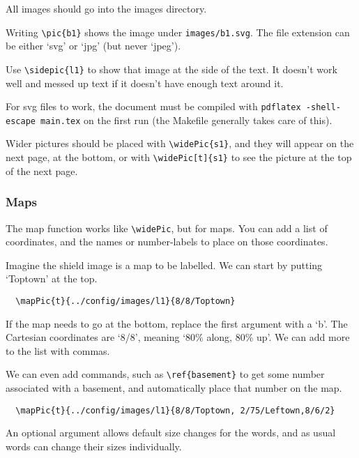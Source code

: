\documentclass[a4paper,openany]{book}
\begin{document}
\begin{multicols}{2}
All images should go into the images directory.

Writing \verb"\pic{b1}" shows the image under \verb"images/b1.svg".
The file extension can be either `svg' or `jpg' (but never `jpeg').

Use \verb"\sidepic{l1}" to show that image at the side of the text.
It doesn't work well and messed up text if it doesn't have enough text around it.


For svg files to work, the document must be compiled with \verb"pdflatex -shell-escape main.tex" on the first run (the Makefile generally takes care of this).

Wider pictures should be placed with \verb"\widePic{s1}", and they will appear on the next page, at the bottom, or with \verb"\widePic[t]{s1}" to see the picture at the top of the next page.


\subsubsection{Maps}

The map function works like \verb"\widePic", but for maps.
You can add a list of coordinates, and the names or number-labels to place on those coordinates.


Imagine the shield image is a map to be labelled.
We can start by putting `Toptown' at the top.

\begin{verbatim}
  \mapPic{t}{../config/images/l1}{8/8/Toptown}
\end{verbatim}

If the map needs to go at the bottom, replace the first argument with a `b'.
The Cartesian coordinates are `8/8', meaning `80\% along, 80\% up'.
We can add more to the list with commas.

We can even add commands, such as \verb"\ref{basement}" to get some number associated with a basement, and automatically place that number on the map.

\begin{verbatim}
  \mapPic{t}{../config/images/l1}{8/8/Toptown, 2/75/Leftown,8/6/2}
\end{verbatim}

An optional argument allows default size changes for the words, and as usual words can change their sizes individually.


\end{multicols}
\end{document}
